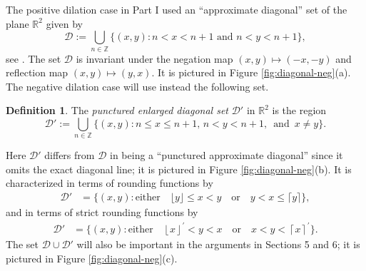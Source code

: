 \documentclass[11pt, letterpaper, reqno]{amsart}
\theoremstyle{definition}
\newtheorem{defi}[thm]{Definition}
\theoremstyle{remark}
\numberwithin{equation}{section}
\newcommand{\RR}{\ensuremath{\mathbb{R}}}
\newcommand{\ZZ}{\ensuremath{\mathbb{Z}}}
\newcommand{\floor}[1]{\lfloor{#1}\rfloor}
\newcommand{\ceil}[1]{\lceil{#1}\rceil}
\newcommand{\sfloor}[1]{\left\lfloor{#1}\right\rfloor^{'}}
\newcommand{\sceil}[1]{\left\lceil{#1}\right\rceil^{'}}
\newcommand{\cD}{\mathcal{D}}
\newcommand{\cDprime}{{\mathcal{D}'}}
\begin{document}
The positive dilation case in Part I
 used an ``approximate diagonal'' set of the plane $\RR^2$ given by 
\begin{equation}\label{eq:approx-diag}
 \mathcal{D} := \bigcup_{n \in \ZZ} \{ (x,y) : n < x < n+1  \text{ and }   n < y < n+1 \}, 
\end{equation}
see \cite[Definition 5.1]{LagR:2018a}.
The  set $\cD$ is invariant under 
the negation map $(x,y) \mapsto (-x, -y)$
and reflection map $(x,y) \mapsto (y,x)$.
It is pictured in Figure \ref{fig:diagonal-neg}(a). 
The negative dilation case will use instead the following set. 
\begin{defi}\label{def:regioncDprime}
The  {\em  punctured enlarged diagonal set} 
$\cDprime$ in $\RR^2$ is  the region
\begin{equation*}
 \cDprime := \bigcup_{n\in\ZZ} \{(x,y) :  n\leq x\leq n+1,\, n < y < n+1,\, \text{ and }\, x\neq y\}.
\end{equation*}
\end{defi}
Here $\cDprime$  differs from $\mathcal{D}$
in being   a ``punctured approximate diagonal'' since it omits the exact diagonal line;
it is pictured in  Figure \ref{fig:diagonal-neg}(b). 
It is characterized in terms of  rounding functions by 
\begin{align}
\label{eq:dprime-round}
 \cDprime &= \{ (x,y) : \text{either} \quad \floor{y} \leq x < y \quad\text{or}\quad y < x \leq \ceil{y} \},
\end{align}
and in terms of strict rounding functions by
 \begin{align}
 \label{eq:dprime-strict}
\cDprime &= \{(x,y) :\text{either} \quad \sfloor{x} < y < x \quad\text{or}\quad x < y< \sceil{x} \} .
\end{align}
The set $\cD \cup \cDprime$ will also be important in the arguments in Sections 5 and 6;
it is  pictured in Figure \ref{fig:diagonal-neg}(c).

%
%
\end{document}
